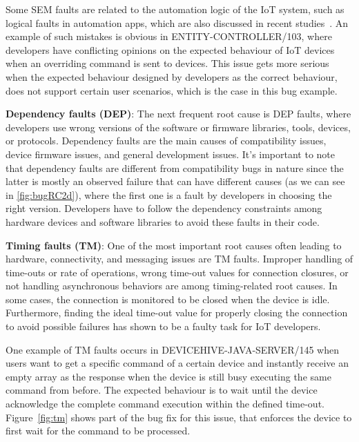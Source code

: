 Some SEM faults are related to the automation logic of the IoT system, such as logical faults in automation apps, which are also discussed in recent studies~\cite{ISSTA2020Interactions}.  An example of such mistakes is obvious in ENTITY-CONTROLLER/103, where developers have conflicting opinions on the expected behaviour of IoT devices when an overriding command is sent to devices. This issue gets more serious when the expected behaviour designed by developers as the correct behaviour, does not support certain user scenarios, which is the case in this bug example.

\textbf{Dependency faults (DEP)}: The next frequent root cause is DEP faults, where developers use wrong versions of the software or firmware libraries, tools, devices, or protocols. Dependency faults are the main causes of compatibility issues, device firmware issues, and general development issues. It's important to note that dependency faults are different from compatibility bugs in nature since the latter is mostly an observed failure that can have different causes (as we can see in \ref{fig:bugRC2d}), where the first one is a fault by developers in choosing the right version. Developers have to follow the dependency constraints among hardware devices and software libraries to avoid these faults in their code.

\textbf{Timing faults (TM)}: One of the most important root causes often leading to hardware, connectivity, and messaging issues are TM faults. Improper handling of time-outs or rate of operations, wrong time-out values for connection closures, or not handling asynchronous behaviors are among timing-related root causes. In some cases, the connection is monitored to be closed when the device is idle. Furthermore, finding the ideal time-out value for properly closing the connection to avoid possible failures has shown to be a faulty task for IoT developers.

One example of TM faults occurs in DEVICEHIVE-JAVA-SERVER/145 when users want to get a specific command of a certain device and instantly receive an empty array as the response when the device is still busy executing the same command from before. The expected behaviour is to wait until the device acknowledge the complete command execution within the defined time-out. Figure~\autoref{fig:tm} shows part of the bug fix for this issue, that enforces the device to first wait for the command to be processed.


